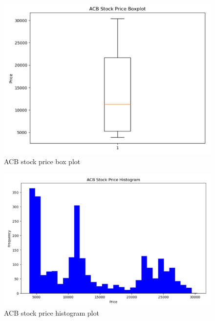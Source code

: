 \documentclass{ieeeojies}
\begin{document}
\begin{figure}[H]
    \centering
    \includegraphics[width=1\linewidth]{ACB_boxplot.png}
    \caption{ACB stock price box plot}
    \label{fig:enter-label}
\end{figure}
\begin{figure}[H]
    \centering
    \includegraphics[width=1\linewidth]{ACB_histogram.png}
    \caption{ACB stock price histogram plot}
    \label{fig:enter-label}
\end{figure}
\end{document}
